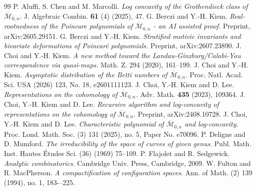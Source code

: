 \documentclass[11pt,letterpaper]{amsart}
\numberwithin{equation}{section}
\theoremstyle{definition}
\newcommand{\cal}{\mathcal}
\def\cM{{\cal M}}
\def\Mbar{\overline{\cM}}
\begin{document}

\begin{thebibliography}{99}
	 P. Aluffi, S. Chen and M. Marcolli. {\em Log concavity of the Grothendieck class of $\overline{\mathcal{M}}_{0,n}$}. J. Algebraic Combin. \textbf{61} (4) (2025), 47.
     G. Berczi and Y.-H. Kiem. {\em Real-rootnedness of the Poincare polynomials of $\overline{\mathcal{M}}_{0,n}$ - an AI assisted proof.} Preprint, arXiv:2605.29151.
     G. Berczi and Y.-H. Kiem. {\em Stratified motivic invariants and bivariate deformations of Poincar\'e polynomials.} Preprint, arXiv:2607.23890.
     J. Choi and Y.-H. Kiem. {\em A new method toward the Landau-Ginzburg/Calabi-Yau correspondence via quasi-maps.} Math. Z. 294 (2020), 161–199.
     J. Choi and Y.-H. Kiem. {\em Asymptotic distribution of the Betti numbers of $\Mbar_{0,n}$}. Proc. Natl. Acad. Sci. USA (2026) 123, No. 18, e2601111123.
     J. Choi, Y.-H. Kiem and D. Lee. {\em Representations on the cohomology of $\overline{\mathcal{M}}_{0,n}$.} Adv. Math. \textbf{435} (2023), 109364.
     J. Choi, Y.-H. Kiem and D. Lee. {\em Recursive algorithm and log-concavity of representations on the cohomology of $\Mbar_{0,n}$}. Preprint, arXiv:2408.10728.
     J. Choi, Y.-H. Kiem and D. Lee. {\em Characteristic polynomial of $\Mbar_{0,n}$ and log-concavity}. Proc. Lond. Math. Soc. (3) 131 (2025), no. 5, Paper No. e70096.
     P. Deligne and D. Mumford. {\em The irreducibility of the space of curves of given genus}. Publ. Math. Inst. Hautes Études Sci. (36) (1969) 75–109.
     P. Flajolet and R. Sedgewick. {\em Analytic combinatorics}. Cambridge Univ. Press, Cambridge, 2009.
     W. Fulton and R. MacPherson. {\em A compactification of configuration spaces}.
Ann. of Math. (2) 139 (1994), no. 1, 183-–225.

\end{thebibliography}
\end{document}
